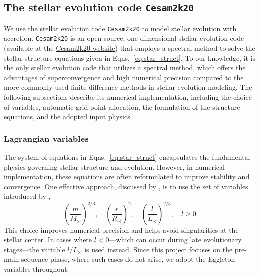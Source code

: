 \documentclass[12pt,a4paper]{article}
\newcommand{\mr}{\mathrm}
\begin{document}


\subsection{The stellar evolution code \texttt{Cesam2k20}}
\label{sec:cesam2k20}

We use the stellar evolution code \texttt{Cesam2k20} \parencite{MarquesEtAl2013,MorelLebreton2008,Morel1997} to model stellar evolution with accretion. \texttt{Cesam2k20} is an open-source, one-dimensional stellar evolution code (available at the \href{https://www.ias.u-psud.fr/cesam2k20/home.html}{Cesam2k20 website}) that employs a spectral method to solve the stellar structure equations given in Eqns.~\eqref{eq:star_struct}. To our knowledge, it is the only stellar evolution code that utilizes a spectral method, which offers the advantages of superconvergence and high numerical precision compared to the more commonly used finite-difference methods in stellar evolution modeling. The following subsections describe its numerical implementation, including the choice of variables, automatic grid-point allocation, the formulation of the structure equations, and the adopted input physics.

\subsubsection{Lagrangian variables}
\label{sec:cesam2k20_variables}

The system of equations in Eqns.~\eqref{eq:star_struct} encapsulates the fundamental physics governing stellar structure and evolution. However, in numerical implementation, these equations are often reformulated to improve stability and convergence. One effective approach, discussed by \textcite{Morel1997}, is to use the set of variables introduced by \textcite{Eggleton1971},
\begin{equation*}
  \left(\frac{m}{M_\odot}\right)^{2/3},\quad \left(\frac{r}{R_\odot}\right)^2,\quad \left(\frac{l}{L_\odot}\right)^{2/3}, \quad l \geq 0
\end{equation*}
This choice improves numerical precision and helps avoid singularities at the stellar center. In cases where $l < 0$—which can occur during late evolutionary stages—the variable $l/L_\odot$ is used instead. Since this project focuses on the pre-main sequence phase, where such cases do not arise, we adopt the Eggleton variables throughout.
\end{document}
